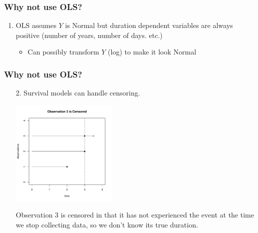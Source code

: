 \documentclass{beamer}
\begin{document}
\begin{frame}
\frametitle{Why not use OLS?}
\pause
\begin{enumerate}
\item OLS assumes $Y$ is Normal but duration dependent variables are
always positive (number of years, number of days. etc.)
\pause
\begin{itemize}
\item Can possibly transform $Y$ (log) to make it look Normal
\end{itemize}
\pause

\begin{figure}[!htp]
\begin{center}
\end{center}
\end{figure}
\end{enumerate}
\end{frame}

\begin{frame}
\frametitle{Why not use OLS?}

\begin{enumerate}
\item[2.] Survival models can handle censoring.
\pause
\begin{center}
\includegraphics[width = 2in, height = 2in]{survival_present-censor.pdf}
\end{center}
\pause
Observation 3 is censored in that it has not experienced the event at
the time we stop collecting data, so we don't know its true duration.
\end{enumerate}
\end{frame}
\end{document}
